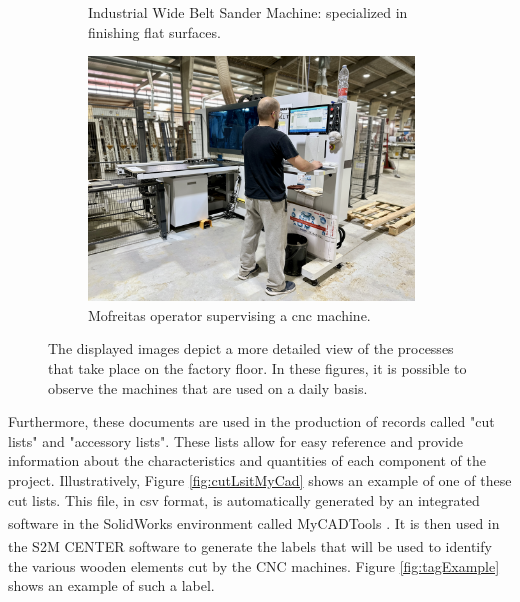 \begin{figure}[!ht]
\begin{subfigure}[b]{0.32\linewidth}
         \caption{Industrial Wide Belt Sander Machine: specialized in  finishing flat surfaces.}
         \label{fig:machine02}
     \end{subfigure}
      \hfill
     \begin{subfigure}[b]{0.32\linewidth}
         \centering
         \includegraphics[width=0.95\textwidth]{images/Development/chap4/machine03.jpg}
         \caption{Mofreitas operator supervising a \acrshort{cnc} machine.}
         \label{fig:machine03}
     \end{subfigure}
     \caption{The displayed images depict a more detailed view of the processes that take place on the factory floor. In these figures, it is possible to observe the machines that are used on a daily basis.}
     \label{fig:shopFloor}
\end{figure}

Furthermore, these documents are used in the production of records called "cut lists" and "accessory lists". These lists allow for easy reference and provide information about the characteristics and quantities of each component of the project. Illustratively, Figure \ref{fig:cutLsitMyCad} shows an example of one of these cut lists. This file, in \acrfull{csv} format, is automatically generated by an integrated software in the SolidWorks\textsuperscript{\textregistered} environment called MyCADTools\textsuperscript{\textregistered} \cite{mycadtools}. It is then used in the S2M CENTER\textsuperscript{\textregistered} software \cite{s2mcenter} to generate the labels that will be used to identify the various wooden elements cut by the CNC machines. Figure \ref{fig:tagExample} shows an example of such a label.

